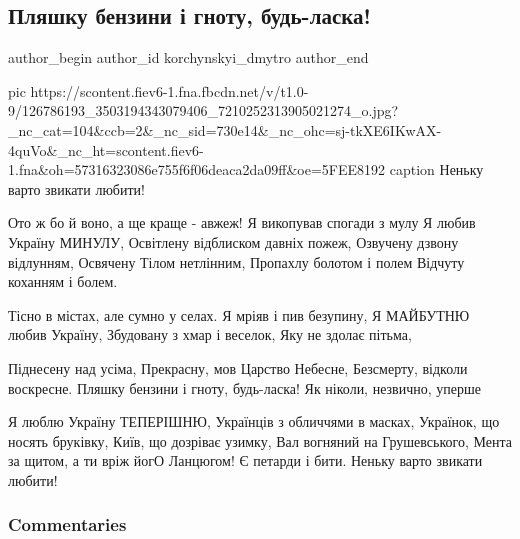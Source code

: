  
 
 
 
 
 
\subsection{Пляшку бензини і гноту, будь-ласка!}
\label{sec:21_11_2020.fb.korchynskyi_dmytro.1.pljashku_benzini}
\ifcmt
	author_begin
   author_id korchynskyi_dmytro
	author_end
\fi

\ifcmt
pic https://scontent.fiev6-1.fna.fbcdn.net/v/t1.0-9/126786193_3503194343079406_7210252313905021274_o.jpg?_nc_cat=104&ccb=2&_nc_sid=730e14&_nc_ohc=sj-tkXE6IKwAX-4quVo&_nc_ht=scontent.fiev6-1.fna&oh=57316323086e755f6f06deaca2da09ff&oe=5FEE8192
caption Неньку варто звикати любити!
\fi

\begin{multicols}{2}
	\obeycr
Ото ж бо й воно, а ще краще - авжеж!
Я викопував спогади з мулу
Я любив Україну МИНУЛУ,
Освітлену відблиском давніх пожеж,
Озвучену дзвону відлунням,
Освячену Тілом нетлінним,
Пропахлу болотом і полем
Відчуту коханням і болем.

Тісно в містах, але сумно у селах.
Я мріяв і пив безупину,
Я МАЙБУТНЮ любив Україну,
Збудовану з хмар і веселок, 
Яку не здолає пітьма,

Піднесену над усіма,
Прекрасну, мов Царство Небесне,
Безсмерту, відколи воскресне.
Пляшку бензини і гноту, будь-ласка!
Як ніколи, незвично, уперше

Я люблю Україну ТЕПЕРІШНЮ,
Українців з обличчями в масках,
Українок, що носять бруківку,
Київ, що дозріває узимку,
Вал вогняний на Грушевського,
Мента за щитом, а ти вріж йогО
Ланцюгом! Є петарди і бити.
Неньку варто звикати любити!
	\restorecr
\end{multicols}

\subsubsection{Commentaries}


